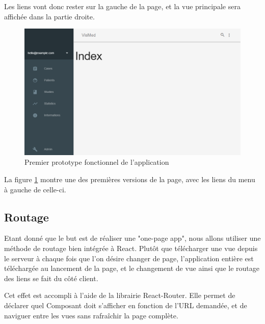 		Les liens vont donc rester sur la gauche de la page, et la vue principale sera affichée dans la partie droite.

		\begin{figure}[!ht]
			\centering
			\includegraphics[width=1\textwidth]{images/realisation/proto1_1}
			\caption{Premier prototype fonctionnel de l'application}
			\label{proto1_1}
		\end{figure}

		La figure \ref{proto1_1} montre une des premières versions de la page, avec les liens du menu à gauche de celle-ci.

	\subsection{Routage}

		Etant donné que le but est de réaliser une "one-page app", nous allons utiliser une méthode de routage bien intégrée à React. Plutôt que télécharger une vue depuis le serveur à chaque fois que l'on désire changer de page, l'application entière est téléchargée au lancement de la page, et le changement de vue ainsi que le routage des liens se fait du côté client.

		Cet effet est accompli à l'aide de la librairie React-Router\cite{react-router}. Elle permet de déclarer quel Composant doit s'afficher en fonction de l'URL demandée, et de naviguer entre les vues sans rafraîchir la page complète.

